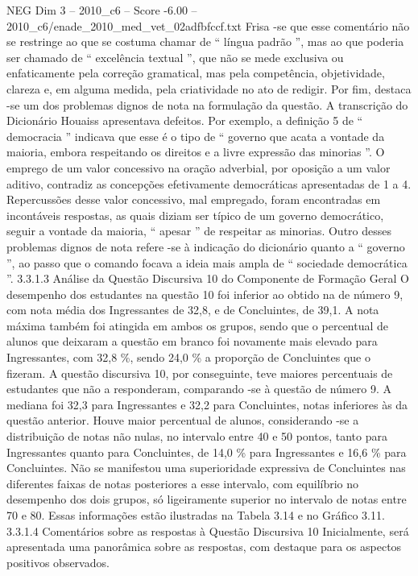 \begin{textsample}{NEG Dim 3 – 2010\_c6 – Score -6.00 – 2010\_c6/enade\_2010\_med\_vet\_02adfbfccf.txt}
Frisa -se que esse comentário não se restringe ao que se costuma chamar de “ língua padrão ”, mas ao que poderia ser chamado de “ excelência textual ”, que não se mede exclusiva ou enfaticamente pela correção gramatical, mas pela competência, objetividade, clareza e, em alguma medida, pela criatividade no ato de redigir.
Por fim, destaca -se um dos problemas dignos de nota na formulação da questão.
A transcrição do Dicionário Houaiss apresentava defeitos.
Por exemplo, a definição 5 de “ democracia ” indicava que esse é o tipo de “ governo que acata a vontade da maioria, embora respeitando os direitos e a livre expressão das minorias ”.
O emprego de um valor concessivo na oração adverbial, por oposição a um valor aditivo, contradiz as concepções efetivamente democráticas apresentadas de 1 a 4.
Repercussões desse valor concessivo, mal empregado, foram encontradas em incontáveis respostas, as quais diziam ser típico de um governo democrático, seguir a vontade da maioria, “ apesar ” de respeitar as minorias.
Outro desses problemas dignos de nota refere -se à indicação do dicionário quanto a “ governo ”, ao passo que o comando focava a ideia mais ampla de “ sociedade democrática ”. 3.3.1.3 Análise da Questão Discursiva 10 do Componente de Formação Geral O desempenho dos estudantes na questão 10 foi inferior ao obtido na de número 9, com nota média dos Ingressantes de 32,8, e de Concluintes, de 39,1.
A nota máxima também foi atingida em ambos os grupos, sendo que o percentual de alunos que deixaram a questão em branco foi novamente mais elevado para Ingressantes, com 32,8 \%, sendo 24,0 \% a proporção de Concluintes que o fizeram.
A questão discursiva 10, por conseguinte, teve maiores percentuais de estudantes que não a responderam, comparando -se à questão de número 9.
A mediana foi 32,3 para Ingressantes e 32,2 para Concluintes, notas inferiores às da questão anterior.
Houve maior percentual de alunos, considerando -se a distribuição de notas não nulas, no intervalo entre 40 e 50 pontos, tanto para Ingressantes quanto para Concluintes, de 14,0 \% para Ingressantes e 16,6 \% para Concluintes.
Não se manifestou uma superioridade expressiva de Concluintes nas diferentes faixas de notas posteriores a esse intervalo, com equilíbrio no desempenho dos dois grupos, só ligeiramente superior no intervalo de notas entre 70 e 80.
Essas informações estão ilustradas na Tabela 3.14 e no Gráfico 3.11. 3.3.1.4 Comentários sobre as respostas à Questão Discursiva 10 Inicialmente, será apresentada uma panorâmica sobre as respostas, com destaque para os aspectos positivos observados.

\end{textsample}
